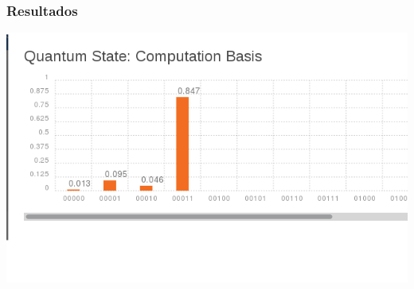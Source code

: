 \documentclass{beamer}
\begin{document}
\begin{frame}
  \frametitle{Resultados}
  \includegraphics[scale=.5]{CNOT-RESULTADOS.png}
\end{frame}
\end{document}
